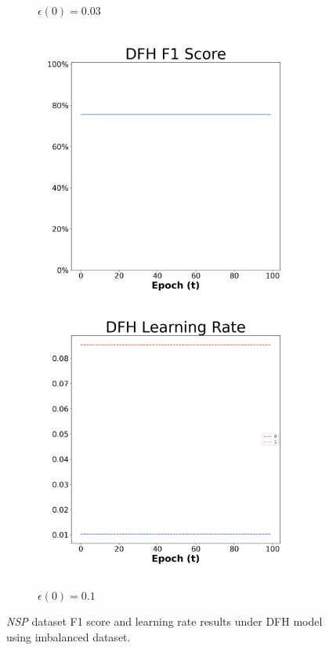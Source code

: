 \begin{figure}[H]
\begin{subfigure}{0.3\textwidth}
  \caption{$\epsilon(0)=0.03$}
\end{subfigure}\hfil %
\begin{subfigure}{0.3\textwidth}
  \includegraphics[width=\linewidth]{images/exper2/NSP/DFH_0.1_f1.png}
  \includegraphics[width=\linewidth]{images/exper2/NSP/DFH_0.1_lr.png}
  \caption{$\epsilon(0)=0.1$}
\end{subfigure}

\caption{\textit{NSP} dataset F1 score and learning rate results under DFH model using imbalanced dataset.}
\end{figure}

